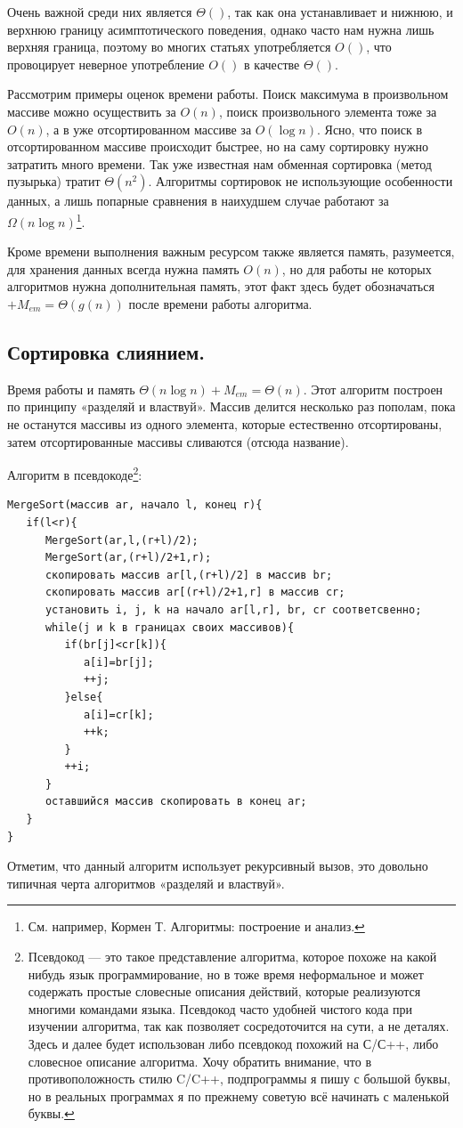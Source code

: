 \documentclass[12pt]{article}
\begin{document}
Очень важной среди них является $\Theta()$, так как она устанавливает и нижнюю, и верхнюю границу асимптотического поведения, однако часто нам нужна лишь верхняя граница, поэтому во многих статьях употребляется $O()$, что провоцирует неверное употребление $O()$ в качестве $\Theta()$.

Рассмотрим примеры оценок времени работы. Поиск максимума в произвольном массиве можно осуществить за $O(n)$, поиск произвольного элемента тоже за $O(n)$, а в уже отсортированном массиве за $O(\log{}n)$. Ясно, что поиск в отсортированном массиве происходит быстрее, но на саму сортировку нужно затратить много времени. Так уже известная нам обменная сортировка (метод пузырька) тратит $\Theta(n^{2})$. Алгоритмы сортировок не использующие особенности данных, а лишь попарные сравнения в наихудшем случае работают за $ \Omega(n\log{n}) $\footnote{См. например, Кормен Т. Алгоритмы: построение и анализ.}.

Кроме времени выполнения важным ресурсом также является память, разумеется, для хранения данных всегда нужна память $O(n)$, но для работы не которых алгоритмов нужна дополнительная память, этот факт здесь будет обозначаться $+M_{em}=\Theta(g(n)) $ после времени работы алгоритма.
\subsection{Сортировка слиянием.}
Время работы и память $ \Theta(n\log{n})+M_{em} =\Theta(n)$. Этот алгоритм построен по принципу «разделяй и властвуй». Массив делится несколько раз пополам, пока не останутся массивы из одного элемента, которые естественно отсортированы, затем отсортированные массивы сливаются  (отсюда название).

Алгоритм в псевдокоде\footnote{Псевдокод — это такое представление алгоритма, которое похоже на какой нибудь язык программирование, но в тоже время неформальное и может содержать простые словесные описания действий, которые реализуются многими командами языка. Псевдокод часто удобней чистого кода при изучении алгоритма, так как позволяет сосредоточится на сути, а не деталях. Здесь и далее будет использован либо псевдокод похожий на С/С++, либо словесное описание алгоритма. Хочу обратить внимание, что в противоположность стилю C/C++, подпрограммы я пишу с большой буквы, но в реальных программах я по прежнему советую всё начинать с маленькой буквы.}:
\begin{verbatim}
MergeSort(массив ar, начало l, конец r){
   if(l<r){
      MergeSort(ar,l,(r+l)/2);
      MergeSort(ar,(r+l)/2+1,r);
      скопировать массив ar[l,(r+l)/2] в массив br;
      скопировать массив ar[(r+l)/2+1,r] в массив cr;
      установить i, j, k на начало ar[l,r], br, cr соответсвенно;
      while(j и k в границах своих массивов){
         if(br[j]<cr[k]){
            a[i]=br[j];
            ++j;
         }else{
            a[i]=cr[k];
            ++k;
         }
         ++i;
      }
      оставшийся массив скопировать в конец ar;
   }
}
\end{verbatim}
Отметим, что данный алгоритм использует рекурсивный вызов, это довольно типичная черта алгоритмов «разделяй и властвуй».
\end{document}
